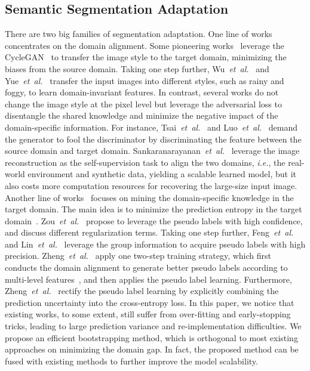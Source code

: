 \documentclass[journal]{IEEEtran}
\def\ie{\emph{i.e.}}
\def\etal{\emph{et~al.}}
\begin{document}
\subsection{Semantic Segmentation Adaptation}
There are two big families of segmentation adaptation. One line of works~\cite{tsai2018learning,tsai2019domain,luo2019significance,luo2020adversarial,gong2019dlow,du2019ssf,chen2019crdoco} concentrates on the domain alignment.
Some pioneering works~\cite{hoffman2018cycada,wu2018dcan} leverage the CycleGAN~\cite{CycleGAN2017} to transfer the image style to the target domain, minimizing the biases from the source domain.
Taking one step further, Wu~\etal~\cite{wu2019ace} and Yue~\etal~\cite{yue2019domain} transfer the input images into different styles, such as rainy and foggy, to learn domain-invariant features. In contrast, several works do not change the image style at the pixel level but leverage the adversarial loss to disentangle the shared knowledge and minimize the negative impact of the domain-specific information. For instance, Tsai~\etal~\cite{tsai2018learning} and Luo~\etal~\cite{luo2019taking} demand the generator to fool the discriminator by discriminating the feature between the source domain and target domain. Sankaranarayanan~\etal~\cite{sankaranarayanan2018learning} leverage the image reconstruction as the self-supervision task to align the two domains, \ie, the real-world environment and synthetic data, yielding a scalable learned model, but it also costs more computation resources for recovering the large-size input image.  
Another line of works~\cite{zou2018unsupervised,zou2019confidence,zheng2019unsupervised,zhou2020uncertainty,li2019bidirectional,zhang2021prototypical} focuses on mining the domain-specific knowledge in the target domain. The main idea is to minimize the prediction entropy in the target domain~\cite{huang2018multi,ding2019feature,DingFXY20}. Zou~\etal~\cite{zou2018unsupervised,zou2019confidence}
propose to leverage the pseudo labels with high confidence, and discuss different regularization terms.
Taking one step further, Feng~\etal~\cite{feng2021complementary} and Lin~\etal~\cite{lin2020unsupervised} leverage the group information to acquire pseudo labels with high precision. Zheng~\etal~\cite{zheng2019unsupervised} apply one two-step training strategy, which first conducts the domain alignment to generate better pseudo labels according to multi-level features~\cite{yang2021multiple}, and then applies the pseudo label learning. Furthermore, Zheng~\etal~\cite{zheng2020unsupervised}  rectify the pseudo label learning by explicitly combining the prediction uncertainty into the cross-entropy loss.
In this paper, we notice that existing works, to some extent, still suffer from over-fitting and early-stopping tricks, leading to large prediction variance and re-implementation difficulties. We propose an efficient bootstrapping method, which is orthogonal to  most existing approaches on minimizing the domain gap. In fact, the proposed method can be fused with existing methods to further improve the model scalability.   
\end{document}
